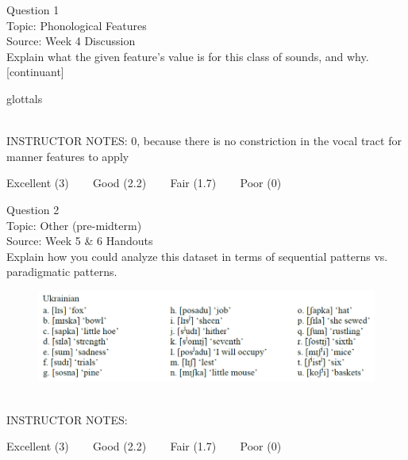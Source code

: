 \documentclass[12pt]{article}
\begin{document}
{\large Question 1}\\

Topic: Phonological Features\\
Source: Week 4 Discussion\\

Explain what the given feature’s value is for this class of sounds, and why.\\

{[continuant]}

glottals


~\\
INSTRUCTOR NOTES: 0, because there is no constriction in the vocal tract for manner features to apply


\vfill
Excellent (3) ~~~ Good (2.2) ~~~ Fair (1.7) ~~~ Poor (0)
\newpage

{\large Question 2}\\

Topic: Other (pre-midterm)\\
Source: Week 5 \& 6 Handouts\\

Explain how you could analyze this dataset in terms of sequential patterns vs. paradigmatic patterns.\\

\begin{figure}[H]
\includegraphics{../images/ukrainian.png}
\end{figure}

~\\
INSTRUCTOR NOTES: 


\vfill
Excellent (3) ~~~ Good (2.2) ~~~ Fair (1.7) ~~~ Poor (0)
\newpage

\begin{center}
\textbf{{\color{red}{\HUGE END OF EXAM}}}\\

\end{center}
\newpage

\begin{center}
\textbf{{\color{blue}{\HUGE START OF EXAM\\}}}

\textbf{{\color{blue}{\HUGE Student ID: 67535\\}}}

\textbf{{\color{blue}{\HUGE 4:30\\}}}

\end{center}
\newpage
\end{document}
